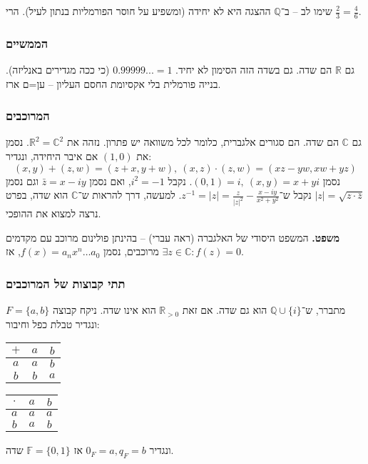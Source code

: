 \documentclass[]{article}
\newcommand\R     {\mathbb{R}}
\newcommand\Q     {\mathbb{Q}}
\newcommand\C     {\mathbb{C}}
\newcommand\op    {^{-1}}
\begin{document}
	שימו לב – ב־$\Q$ ההצגה היא לא יחידה (ומשפיע על חוסר הפורמליות בנתון לעיל). הרי $\frac{2}{3}  = \frac{4}{6}$. 
	
	\subsubsection{הממשיים}
	גם $\R$ הם שדה. 	גם בשדה הזה הסימון לא יחיד. $0.99999... = 1$ (כי ככה מגדירים באנליזה). בנייה פורמלית בלי אקסיומת החסם העליון – ען=ם ארז. 
	
	\subsubsection{המרוכבים}
	גם $\C$ הם שדה. 	הם סגורים אלגברית, כלומר לכל משוואה יש פתרון. נזהה את $\R^2 = \C^2$. נסמן את $(1, 0)$ אם איבר היחידה, ונגדיר: 
	\[ (x, y) + (z, w) = (z + x, y + w), \ (x, z) \cdot (z, w) =  (xz - yw, xw + yz) \]
	נסמן $(0, 1) = i, \ (x, y) = x + yi$. נקבל $i^2 = -1$, ואם נסמן $\bar z = x - iy$ וגם נסמן $|z| = \sqrt{z \cdot \bar z}$ נקבל ש־$z\op = |z| = \frac{z}{|z|^2} - \frac{x - iy}{x^2 + y^2}$. למעשה, דרך להראות ש־$\C$ הוא שדה, בפרט נרצה למצוא את ההופכי. 
	
	\textbf{משפט. }המשפט היסודי של האלגברה (ראה עברי) – בהינתן פולינום מרוכב עם מקדמים מרוכבים, נסמן $f(x) = a_nx^n \dots a_0$, אז $\exists z \in \C \colon f(z) = 0$. 
	
	\subsubsection{תתי קבוצות של המרוכבים}
	מתברר, ש־$\Q \cup \{i\}$ הוא גם שדה. אם זאת $\R_{> 0}$ הוא אינו שדה. ניקח קבוצה $F = \{a, b\}$ ונגדיר טבלת כפל וחיבור:
	
	\begin{center}
		\begin{tabular}{|c|c|c|}
			\hline $+$ &  $a$ & $b$ \\
			\hline $a$ & $a$ & $b$ \\
			\hline $b $& $b$ & $a$ \\ \hline 
		\end{tabular} \quad \begin{tabular}{|c|c|c|}
		 	\hline $\cdot$ & $a$ & $b$ \\
		 	\hline $a$ & $a$ & $a$ \\
		 	\hline $b$ & $a$ & $b$ \\ \hline 
		\end{tabular}
	\end{center}
	ונגדיר $0_F = a, q_F = b$ אז $\mathbb{F} = \{0, 1\}$ שדה. 
	
\end{document}
